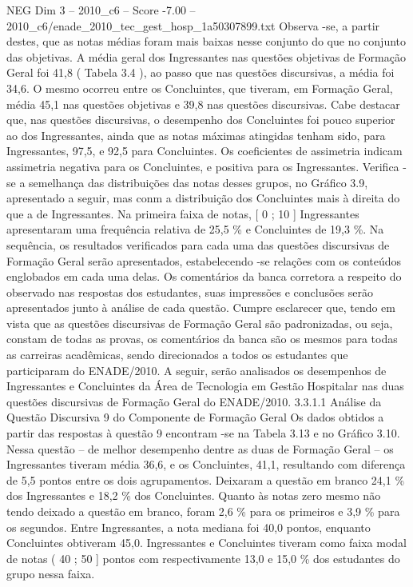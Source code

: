 \begin{textsample}{NEG Dim 3 – 2010\_c6 – Score -7.00 – 2010\_c6/enade\_2010\_tec\_gest\_hosp\_1a50307899.txt}
Observa -se, a partir destes, que as notas médias foram mais baixas nesse conjunto do que no conjunto das objetivas.
A média geral dos Ingressantes nas questões objetivas de Formação Geral foi 41,8 ( Tabela 3.4 ), ao passo que nas questões discursivas, a média foi 34,6.
O mesmo ocorreu entre os Concluintes, que tiveram, em Formação Geral, média 45,1 nas questões objetivas e 39,8 nas questões discursivas.
Cabe destacar que, nas questões discursivas, o desempenho dos Concluintes foi pouco superior ao dos Ingressantes, ainda que as notas máximas atingidas tenham sido, para Ingressantes, 97,5, e 92,5 para Concluintes.
Os coeficientes de assimetria indicam assimetria negativa para os Concluintes, e positiva para os Ingressantes.
Verifica -se a semelhança das distribuições das notas desses grupos, no Gráfico 3.9, apresentado a seguir, mas conm a distribuição dos Concluintes mais à direita do que a de Ingressantes.
Na primeira faixa de notas, [ 0 ; 10 ] Ingressantes apresentaram uma frequência relativa de 25,5 \% e Concluintes de 19,3 \%.
Na sequência, os resultados verificados para cada uma das questões discursivas de Formação Geral serão apresentados, estabelecendo -se relações com os conteúdos englobados em cada uma delas.
Os comentários da banca corretora a respeito do observado nas respostas dos estudantes, suas impressões e conclusões serão apresentados junto à análise de cada questão.
Cumpre esclarecer que, tendo em vista que as questões discursivas de Formação Geral são padronizadas, ou seja, constam de todas as provas, os comentários da banca são os mesmos para todas as carreiras acadêmicas, sendo direcionados a todos os estudantes que participaram do ENADE/2010.
A seguir, serão analisados os desempenhos de Ingressantes e Concluintes da Área de Tecnologia em Gestão Hospitalar nas duas questões discursivas de Formação Geral do ENADE/2010. 3.3.1.1 Análise da Questão Discursiva 9 do Componente de Formação Geral Os dados obtidos a partir das respostas à questão 9 encontram -se na Tabela 3.13 e no Gráfico 3.10.
Nessa questão – de melhor desempenho dentre as duas de Formação Geral – os Ingressantes tiveram média 36,6, e os Concluintes, 41,1, resultando com diferença de 5,5 pontos entre os dois agrupamentos.
Deixaram a questão em branco 24,1 \% dos Ingressantes e 18,2 \% dos Concluintes.
Quanto às notas zero mesmo não tendo deixado a questão em branco, foram 2,6 \% para os primeiros e 3,9 \% para os segundos.
Entre Ingressantes, a nota mediana foi 40,0 pontos, enquanto Concluintes obtiveram 45,0.
Ingressantes e Concluintes tiveram como faixa modal de notas ( 40 ; 50 ] pontos com respectivamente 13,0 e 15,0 \% dos estudantes do grupo nessa faixa.

\end{textsample}
